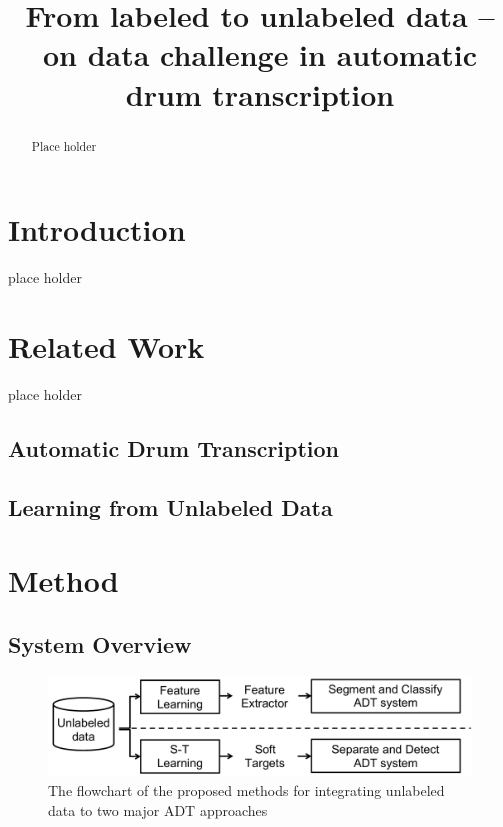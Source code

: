 \documentclass{article}
\title{From labeled to unlabeled data -- on data challenge in automatic drum transcription}
\begin{document}
%
\maketitle
%
\begin{abstract}
Place holder
\end{abstract}
%
\section{Introduction}\label{sec:introduction}

place holder
%
\section{Related Work}
%
place holder
%
\subsection{Automatic Drum Transcription}
\subsection{Learning from Unlabeled Data}
%
\section{Method}
\subsection{System Overview}
\begin{figure}
\centering
\includegraphics[width = \columnwidth]{./figs/paradigms_overview.pdf}
\caption{The flowchart of the proposed methods for integrating unlabeled data to two major ADT approaches}
\label{fig:flowchart}
\end{figure}
\end{document}
